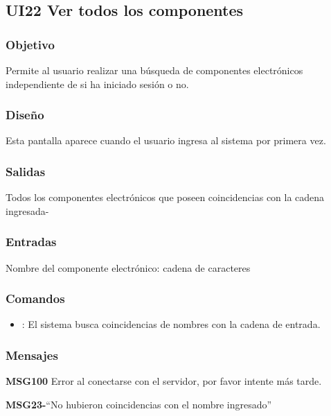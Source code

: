 \subsection{UI22 Ver todos los componentes}

\subsubsection{Objetivo}
	Permite al usuario realizar una búsqueda de componentes electrónicos independiente de si ha iniciado sesión o no.

\subsubsection{Diseño}
	Esta pantalla aparece cuando el usuario ingresa al sistema por primera vez.


\subsubsection{Salidas}

	Todos los componentes electrónicos que poseen coincidencias con la cadena ingresada-

\subsubsection{Entradas}

	Nombre del componente electrónico: cadena de caracteres

\subsubsection{Comandos}

\begin{itemize}
	\item {}: El sistema busca coincidencias de nombres con la cadena de entrada.
\end{itemize}

\subsubsection{Mensajes}
	\begin{Citemize}
		\item {\bf MSG100} Error al conectarse con el servidor, por favor intente más tarde.
		\item {\bf MSG23-}``No hubieron coincidencias con el nombre ingresado''
	\end{Citemize}